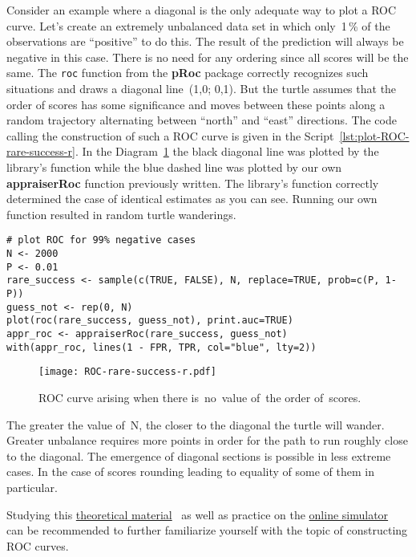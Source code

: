 \documentclass[]{scrreprt}
\begin{document}
Consider an example where a diagonal is the only adequate way to plot a ROC curve. Let's create an extremely unbalanced data set in which only~1\,\% of the observations are ``positive'' to do this. The result of the prediction will always be negative in this case. There is no need for any ordering since all scores will be the same. The \texttt{roc} function from the \textbf{pRoc} package correctly recognizes such situations and draws a diagonal line~(1,0; 0,1). But the turtle assumes that the order of scores has some significance and moves between these points along a random trajectory alternating between ``north'' and ``east'' directions. The code calling the construction of such a ROC curve is given in the Script~\ref{lst:plot-ROC-rare-success-r}. In the Diagram~\ref{fig:ROC-rare-success-r} the black diagonal line was plotted by the library's function while the blue dashed line was plotted by our own \textbf{appraiserRoc} function previously written. The library's function correctly determined the case of identical estimates as you can see. Running our own function resulted in random turtle wanderings.
%
\begin{lstlisting}[float=htp, caption = Plotting the ROC curve in~case of~absence of~order of~scores, firstnumber=1, label= lst:plot-ROC-rare-success-r]
# plot ROC for 99% negative cases
N <- 2000
P <- 0.01
rare_success <- sample(c(TRUE, FALSE), N, replace=TRUE, prob=c(P, 1-P))
guess_not <- rep(0, N)
plot(roc(rare_success, guess_not), print.auc=TRUE)
appr_roc <- appraiserRoc(rare_success, guess_not)
with(appr_roc, lines(1 - FPR, TPR, col="blue", lty=2))
\end{lstlisting}
%
\begin{figure}[htp]
	\centering
	\texttt{[image: ROC-rare-success-r.pdf]}
	\caption{ROC curve arising when there is~no~value of~the order of~scores.}
	\label{fig:ROC-rare-success-r}
\end{figure}
%

The greater the value of~N, the closer to the diagonal the turtle will wander. Greater unbalance requires more points in order for the path to run roughly close to the diagonal. The emergence of diagonal sections is possible in less extreme cases. In the case of scores rounding leading to equality of some of them in particular.

Studying this \href{https://web.tresorit.com/l/APSpC#AfkTKO5_-ijMhPuXE-qEzg}{theoretical material}~\cite{ROC-analysis} as well as practice on the \href{https://kennis-research.shinyapps.io/ROC-Curves/}{online simulator}~\cite{ROC-curve-practice} can be recommended to further familiarize yourself with the topic of constructing ROC curves.
%
\end{document}
